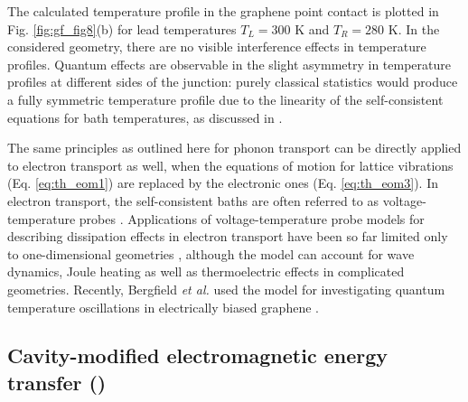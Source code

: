 The calculated temperature profile in the graphene point contact is plotted in Fig. \ref{fig:gf_fig8}(b) for lead temperatures $T_L=300$ K and $T_R=280$ K. In the considered geometry, there are no visible interference effects in temperature profiles. Quantum effects are observable in the slight asymmetry in temperature profiles at different sides of the junction: purely classical statistics would produce a fully symmetric temperature profile due to the linearity of the self-consistent equations for bath temperatures, as discussed in .

The same principles as outlined here for phonon transport can be directly applied to electron transport as well, when the equations of motion for lattice vibrations (Eq. \eqref{eq:th_eom1}) are replaced by the electronic ones (Eq. \eqref{eq:th_eom3}). In electron transport, the self-consistent baths are often referred to as voltage-temperature probes \cite{jacquet09}. Applications of voltage-temperature probe models for describing dissipation effects in electron transport have been so far limited only to one-dimensional geometries \cite{buttiker86,damato90,jacquet09,jacquet12}, although the model can account for wave dynamics, Joule heating as well as thermoelectric effects \cite{roy07} in complicated geometries. Recently, Bergfield \textit{et al.} used the model for investigating quantum temperature oscillations in electrically biased graphene \cite{bergfield15}.

\subsection{Cavity-modified electromagnetic energy transfer ()}
\label{sec:results_cavity}

